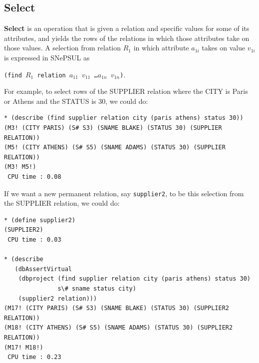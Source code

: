 \documentclass{book}
\begin{document}
\subsection{Select}
{\bf Select} is an operation that is given a relation and specific
values for some of its attributes, and yields the rows of the
relations in which those attributes take on those values.  A selection
from relation $R_1$ in which attribute $a_{1i}$ takes on value
$v_{1i}$ is expressed in SNePSUL as
\begin{center}
{\tt (find $R_1$ relation $a_{11}$ $v_{11}$ \ldots $a_{1n}$ $v_{1n}$)}.
\end{center}
For example, to select rows of the SUPPLIER relation where the CITY is
Paris or Athens and the STATUS is 30, we could do:
\begin{verbatim}
* (describe (find supplier relation city (paris athens) status 30))
(M3! (CITY PARIS) (S# S3) (SNAME BLAKE) (STATUS 30) (SUPPLIER RELATION))
(M5! (CITY ATHENS) (S# S5) (SNAME ADAMS) (STATUS 30) (SUPPLIER RELATION))
(M3! M5!)
 CPU time : 0.08
\end{verbatim}
If we want a new permanent relation, say {\tt supplier2}, to be this
selection from the SUPPLIER relation, we could do:
\begin{verbatim}
* (define supplier2)
(SUPPLIER2)
 CPU time : 0.03 

* (describe
   (dbAssertVirtual
    (dbproject (find supplier relation city (paris athens) status 30)
               s\# sname status city)
    (supplier2 relation)))
(M17! (CITY PARIS) (S# S3) (SNAME BLAKE) (STATUS 30) (SUPPLIER2 RELATION))
(M18! (CITY ATHENS) (S# S5) (SNAME ADAMS) (STATUS 30) (SUPPLIER2 RELATION))
(M17! M18!)
 CPU time : 0.23 
\end{verbatim}
\end{document}
